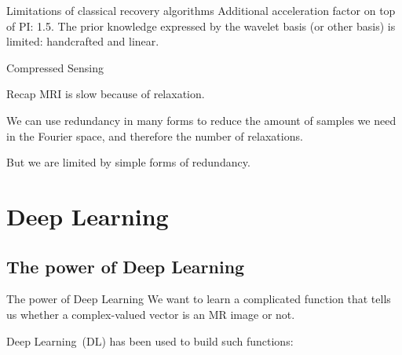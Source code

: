 \documentclass[aspectratio=169,xcolor=dvipsnames]{beamer}
\begin{document}



\begin{frame}{Limitations of classical recovery algorithms}
    Additional acceleration factor on top of PI: 1.5. %
    \pause
    The prior knowledge expressed by the wavelet basis (or other basis) is limited: handcrafted and linear.
\end{frame}

\begin{frame}{Compressed Sensing}
    \begin{block}{Recap}
        MRI is slow because of relaxation. 
        
        We can use redundancy in many forms to reduce the amount of samples we need in the Fourier space, and therefore the number of relaxations.
        
        But we are limited by simple forms of redundancy.
    \end{block}
\end{frame}

\section{Deep Learning}

\subsection{The power of Deep Learning}
\begin{frame}{The power of Deep Learning}
    We want to learn a complicated function that tells us whether a complex-valued vector is an MR image or not.
    \pause

    Deep Learning~(DL) has been used to build such functions:
\end{frame}
\end{document}
